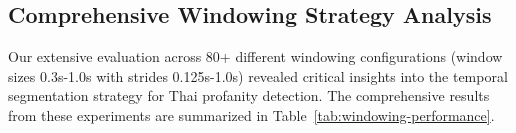\documentclass[11pt]{article}
\begin{document}
\begin{table}[H]
    \label{tab:stride-comparison}
    \caption{Comparison of window stride (hop length) for 0.5s window length. Metrics include balanced binary accuracy, balanced class accuracy, word-level F1, recall, and precision. All values are percentages (\%).}
    \centering
\end{table}

\subsection{Comprehensive Windowing Strategy Analysis}
Our extensive evaluation across 80+ different windowing configurations (window sizes 0.3s-1.0s with strides 0.125s-1.0s) revealed critical insights into the temporal segmentation strategy for Thai profanity detection. The comprehensive results from these experiments are summarized in Table~\ref{tab:windowing-performance}.
\end{document}
